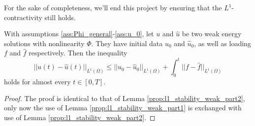 \documentclass[11pt, a4paper]{article}
\begin{document}
For the sake of completeness, we'll end this project by ensuring that the $L^1$-contractivity still holds.

\begin{theorem}
\label{lem:l1_stability_weak_final}
With assumptions \ref{ass:Phi_general}-\ref{ass:u_0},  let $u$ and $\hat{u}$ be two weak energy solutions with nonlinearity $\Phi$. They have initial data $u_0$ and $\hat{u}_0$, as well as loading $f$ and $\hat{f}$ respectively. Then the inequality
\begin{equation}
||u(t) - \hat{u}(t)||_{L^1(\Omega)} \leq ||u_0 - \hat{u}_0||_{L^1(\Omega)} + \int_0^t||f-\hat{f}||_{L^1(\Omega)}
\end{equation}
holds for almost every $t\in [0,T]$.
\end{theorem}

\begin{proof}
The proof is identical to that of Lemma \ref{prop:l1_stability_weak_part2}, only now the use of Lemma \ref{prop:l1_stability_weak_part1} is exchanged with use of Lemma \ref{prop:l1_stability_weak_part2}.
\end{proof}





\newpage


\end{document}
